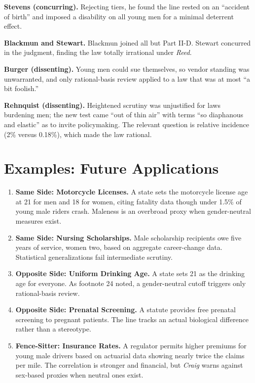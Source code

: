 \documentclass[12pt]{article}
\begin{document}
\textbf{Stevens (concurring).} Rejecting tiers, he found the line rested on an ``accident of birth'' and imposed a disability on all young men for a minimal deterrent effect.

\textbf{Blackmun and Stewart.} Blackmun joined all but Part II-D. Stewart concurred in the judgment, finding the law totally irrational under \textit{Reed}.

\textbf{Burger (dissenting).} Young men could sue themselves, so vendor standing was unwarranted, and only rational-basis review applied to a law that was at most ``a bit foolish.''

\textbf{Rehnquist (dissenting).} Heightened scrutiny was unjustified for laws burdening men; the new test came ``out of thin air'' with terms ``so diaphanous and elastic'' as to invite policymaking. The relevant question is relative incidence (2\% versus 0.18\%), which made the law rational.

\section{Examples: Future Applications}

\begin{enumerate}
\item \textbf{Same Side: Motorcycle Licenses.} A state sets the motorcycle license age at 21 for men and 18 for women, citing fatality data though under 1.5\% of young male riders crash. Maleness is an overbroad proxy when gender-neutral measures exist.
\item \textbf{Same Side: Nursing Scholarships.} Male scholarship recipients owe five years of service, women two, based on aggregate career-change data. Statistical generalizations fail intermediate scrutiny.
\item \textbf{Opposite Side: Uniform Drinking Age.} A state sets 21 as the drinking age for everyone. As footnote 24 noted, a gender-neutral cutoff triggers only rational-basis review.
\item \textbf{Opposite Side: Prenatal Screening.} A statute provides free prenatal screening to pregnant patients. The line tracks an actual biological difference rather than a stereotype.
\item \textbf{Fence-Sitter: Insurance Rates.} A regulator permits higher premiums for young male drivers based on actuarial data showing nearly twice the claims per mile. The correlation is stronger and financial, but \textit{Craig} warns against sex-based proxies when neutral ones exist.
\end{enumerate}
\end{document}
